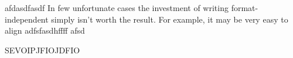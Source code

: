 afdasdfasdf
In few unfortunate cases the investment of writing format-independent \latex simply isn't worth the result. For example, it may be very easy to align adfsfasdhffff
afsd

SEVOIPJFIOJDFIO